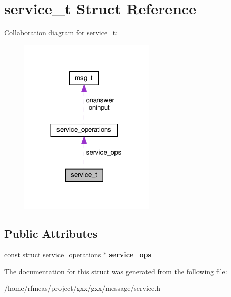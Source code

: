 \hypertarget{structservice__t}{}\section{service\+\_\+t Struct Reference}
\label{structservice__t}


Collaboration diagram for service\+\_\+t\+:
\nopagebreak
\begin{figure}[H]
\begin{center}
\leavevmode
\includegraphics[width=185pt]{structservice__t__coll__graph}
\end{center}
\end{figure}
\subsection*{Public Attributes}
\begin{DoxyCompactItemize}
\item 
const struct \hyperlink{structservice__operations}{service\+\_\+operations} $\ast$ {\bfseries service\+\_\+ops}\hypertarget{structservice__t_a849af1be0e987d257e7f160755c8bae8}{}\label{structservice__t_a849af1be0e987d257e7f160755c8bae8}

\end{DoxyCompactItemize}


The documentation for this struct was generated from the following file\+:\begin{DoxyCompactItemize}
\item 
/home/rfmeas/project/gxx/gxx/message/service.\+h\end{DoxyCompactItemize}
